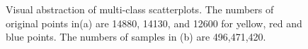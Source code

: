 \begin{figure}[htb]
  \centering

  \caption{Visual abstraction of multi-class scatterplots.
   The numbers of original points in(a) are 14880, 14130, and 12600 for yellow, red and blue points.
   The numbers of samples in (b) are 496,471,420.}
   \label{visual-abstraction}
\end{figure}


